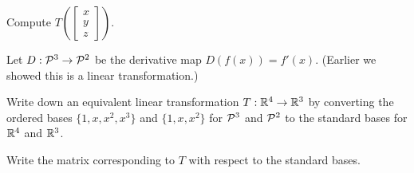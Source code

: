 \begin{applicationActivities}{1}{17}
\begin{activity}{5}
Compute $T\left(\begin{bmatrix} x\\ y \\ z \end{bmatrix} \right) $.
\end{activity}


\begin{activity}{10}
Let $D: \P^3 \rightarrow \P^2$ be the derivative map \(D(f(x))=f'(x)\).
(Earlier we showed this is a linear transformation.)
\begin{subactivity}
Write down an equivalent linear transformation $T: \IR^4 \rightarrow \IR^3$
by converting the ordered bases \(\{1,x,x^2,x^3\}\) and \(\{1,x,x^2\}\) for
\(\P^3\) and \(\P^2\) to the
standard bases for \(\IR^4\) and \(\IR^3\).
\end{subactivity}
\begin{subactivity}
Write the matrix corresponding to $T$ with respect to the standard bases.
\end{subactivity}
\end{activity}

\end{applicationActivities}
